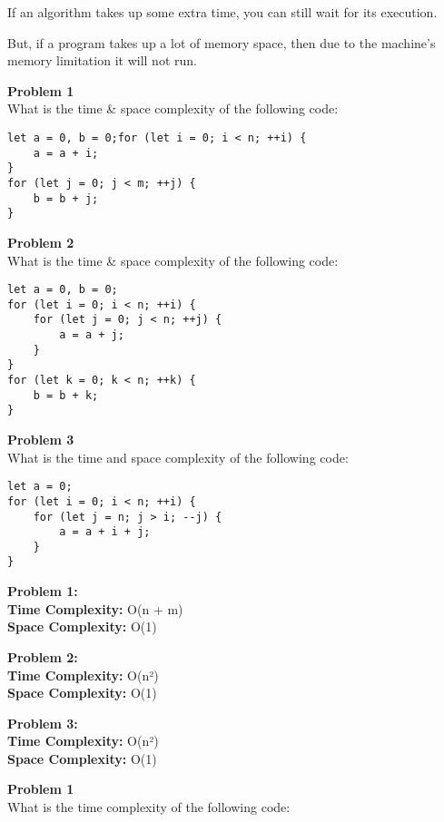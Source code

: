 If an algorithm takes up some extra time, you can still wait for its
execution.

But, if a program takes up a lot of memory space, then due to the machine's memory limitation it will not run.

\hypertarget{dc2a}{\label{dc2a}}

\textbf{Problem 1}\\
What is the time \& space complexity of the following code:

\begin{verbatim}
let a = 0, b = 0;for (let i = 0; i < n; ++i) {
    a = a + i;
}
for (let j = 0; j < m; ++j) {
    b = b + j;
}
\end{verbatim}

\textbf{Problem 2}\\
What is the time \& space complexity of the following code:

\begin{verbatim}
let a = 0, b = 0;
for (let i = 0; i < n; ++i) {
    for (let j = 0; j < n; ++j) {
        a = a + j;
    }
}
for (let k = 0; k < n; ++k) {
    b = b + k;
}
\end{verbatim}

\textbf{Problem 3}\\
What is the time and space complexity of the following code:

\begin{verbatim}
let a = 0;
for (let i = 0; i < n; ++i) {
    for (let j = n; j > i; --j) {
        a = a + i + j;
    }
}
\end{verbatim}

\hypertarget{40cb}{\label{40cb}}

\textbf{Problem 1:}\\
\textbf{Time Complexity:} O(n + m)\\
\textbf{Space Complexity:} O(1)

\textbf{Problem 2:}\\
\textbf{Time Complexity:} O(n²)\\
\textbf{Space Complexity:} O(1)

\textbf{Problem 3:}\\
\textbf{Time Complexity:} O(n²)\\
\textbf{Space Complexity:} O(1)

\hypertarget{5ac3}{\label{5ac3}}

\textbf{Problem 1}\\
What is the time complexity of the following code:

